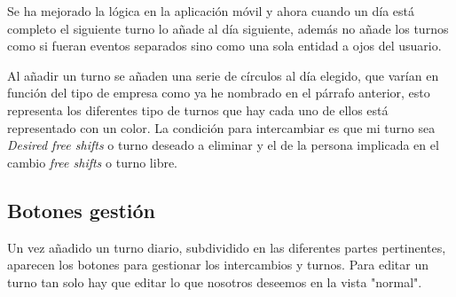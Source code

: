 Se ha mejorado la lógica en la aplicación móvil y ahora cuando un día está completo el siguiente turno lo añade al día siguiente, además no añade los turnos como si fueran eventos separados sino como una sola entidad a ojos del usuario.


Al añadir un turno se añaden una serie de círculos al día elegido, que varían en función del tipo de empresa como ya he nombrado en el párrafo anterior, esto representa los diferentes tipo de turnos que hay cada uno de ellos está representado con un color. La condición para intercambiar es que mi turno sea  \emph{Desired free shifts} o turno deseado a eliminar y el de la persona implicada en el cambio  \emph{free shifts} o turno libre.


\subsection{Botones gestión}
Un vez añadido un turno diario, subdividido en las diferentes partes pertinentes, aparecen los botones para gestionar los intercambios y turnos.  Para editar un turno tan solo hay que editar lo que nosotros deseemos en la vista "normal". 



